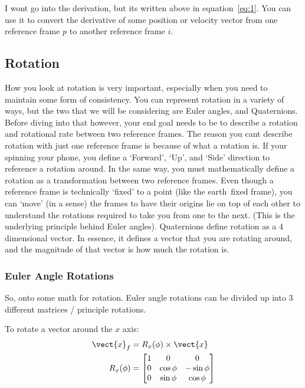 \documentclass{article}
\begin{document}
I wont go into the derivation, but its written above in equation{~}\ref{eq:1}. You can use it  to convert the derivative of some position or velocity vector from one reference frame $p$ to another reference frame $i$.
\subsection{Rotation}
How you look at rotation is very important, especially when you need to maintain some form of consistency. You can represent rotation in a variety of ways, but the two that we will be considering are Euler angles, and Quaternions. Before diving into that however, your end goal needs to be to describe a rotation and rotational rate between two reference frames. The reason you cant describe rotation with just one reference frame is because of what a rotation is. If your spinning your phone, you define a `Forward', `Up', and `Side' direction to reference a rotation around. In the same way, you must mathematically define a rotation as a transformation between two reference frames. Even though a reference frame is technically `fixed' to a point (like the earth{~}fixed frame), you can `move' (in a sense) the frames to have their origins lie on top of each other to understand the rotations required to take you from one to the next. (This is the underlying principle behind Euler angles). Quaternions define rotation as a 4 dimensional vector. In essence, it defines a vector that you are rotating around, and the magnitude of that vector is how much the rotation is.
\subsubsection{Euler Angle Rotations}
So, onto some math for rotation. Euler angle rotations can be divided up into 3 different matrices / principle rotations. 

To rotate a vector around the ${x}$ axis:
\begin{equation} \label{eq:2}
\begin{split}
\vect{x}_f &= R_x(\phi) \times \vect{x} \\
R_{x}(\phi) &= \begin{bmatrix}
    1 & 0 & 0\\
    0 & \cos{\phi} & -\sin{\phi}\\
    0 & \sin{\phi} & \cos{\phi}
\end{bmatrix}
\end{split}
\end{equation}
\end{document}
